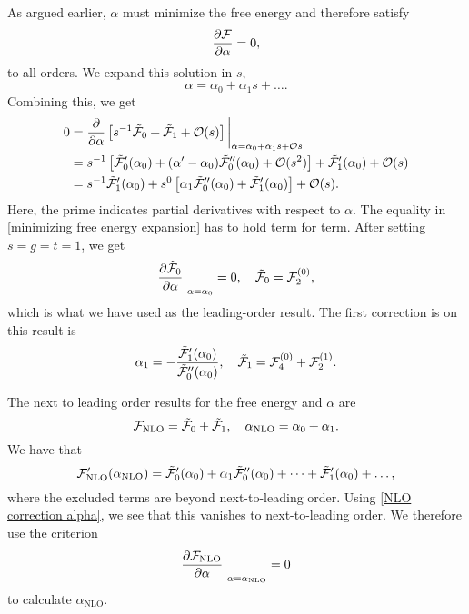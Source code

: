 %
As argued earlier, $\alpha$ must minimize the free energy and therefore satisfy
%
\begin{equation}
    \pdv{\mathcal{F}}{\alpha} = 0,
\end{equation}
%
to all orders.
We expand this solution in $s$,
\begin{equation}
    \alpha = \alpha_0 + \alpha_1 s + \dots.
\end{equation}
%
Combining this, we get
%
\begin{align}
    \nonumber
    0 &
    = 
    \pdv{}{\alpha}
    \left[
        s^{-1}\tilde {\mathcal{F}}_0
        + 
        \tilde {\mathcal{F}}_1
        +
        \mathcal O(s)
    \right]
    \bigg|_{\alpha=\alpha_0 + \alpha_1 s + \mathcal O{s}} 
    \\ \nonumber
    & = 
    s^{-1 }
    \left[
        \tilde {\mathcal{F}}_0'(\alpha_0)
        +
        (\alpha' - \alpha_0)
        \tilde {\mathcal{F}}_0''(\alpha_0)
        +
        \mathcal O(s^2)
    \right]
    +
    \tilde{\mathcal{F}}_1'(\alpha_0)
    +
    \mathcal O(s) \\
    &
    =
    s^{-1} \tilde{\mathcal{F}}_1'(\alpha_0)
    + s^{0}
    \left[
        \alpha_1
        \tilde {\mathcal{F}}_0''(\alpha_0)
        +
    \tilde{\mathcal{F}}_1'(\alpha_0)
    \right]
    +
    \mathcal O(s).
    \label{minimizing free energy expansion}
\end{align}
%
Here, the prime indicates partial derivatives with respect to $\alpha$.
The equality in \autoref{minimizing free energy expansion} has to hold term for term.
After setting $s = g = t = 1$, we get
%
\begin{align*}
    \pdv{\tilde {\mathcal{F}}_0}{\alpha}\bigg|_{\alpha=\alpha_0} = 0, \quad
    \tilde {\mathcal{F}}_0 = \mathcal{F}_2^{(0)},
\end{align*}
%
which is what we have used as the leading-order result. 
The first correction is on this result is
%
\begin{equation}
    \label{NLO correction alpha}
    \alpha_1 = - \frac{\tilde {\mathcal{F}}_1'(\alpha_0)}{{\tilde {\mathcal{F}}_0''(\alpha_0)}},
    \quad 
    \tilde {\mathcal{F}}_1 = \mathcal{F}_{4}^{(0)} + \mathcal{F}_{2}^{(1)}.
\end{equation}
%

The next to leading order results for the free energy and $\alpha$ are
%
\begin{equation}
    \mathcal{F}_\mathrm{NLO} = \tilde {\mathcal{F}}_0 + \tilde {\mathcal{F}}_1, \quad
    \alpha_\mathrm{NLO} = \alpha_0 + \alpha_1.
\end{equation}
%
We have that
%
\begin{equation}
    \mathcal{F}_\mathrm{NLO}'(\alpha_\mathrm{NLO})
    = \tilde {\mathcal{F}}_0'(\alpha_0) + \alpha_1 \tilde {\mathcal{F}}_0''(\alpha_0) + \dots
    + \tilde {\mathcal{F}}_1'(\alpha_0) + \dots,
\end{equation}
%
where the excluded terms are beyond next-to-leading order.
Using \autoref{NLO correction alpha}, we see that this vanishes to next-to-leading order.
We therefore use the criterion
%
\begin{equation}
    \label{alpha nlo method 2}
    \pdv{\mathcal{F}_\mathrm{NLO}}{\alpha} \bigg|_{\alpha=\alpha_{\mathrm{NLO}}} = 0
\end{equation}
%
to calculate $\alpha_\text{NLO}$.

